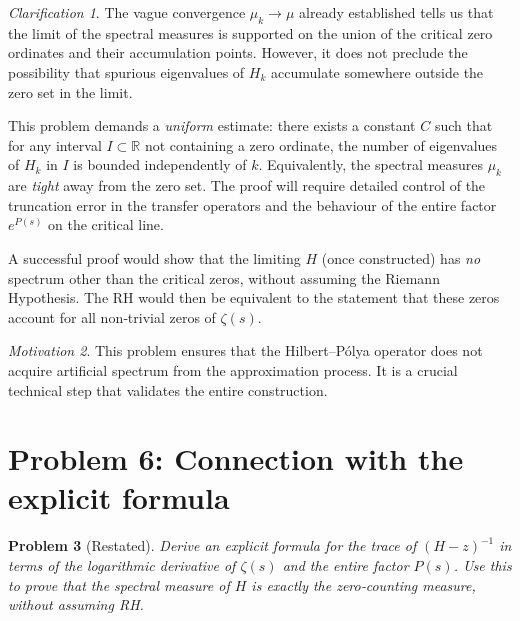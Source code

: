 \documentclass[11pt,a4paper]{article}
\newtheorem{problem}{Problem}[section]
\theoremstyle{remark}
\newtheorem{clarification}[problem]{Clarification}
\newtheorem{motivation}[problem]{Motivation}
\newcommand{\bbR}{\mathbb{R}}
\begin{document}
\begin{clarification}
The vague convergence $\mu_k\to\mu$ already established tells us that the limit of the spectral measures is supported on the union of the critical zero ordinates and their accumulation points. However, it does not preclude the possibility that spurious eigenvalues of $H_k$ accumulate somewhere outside the zero set in the limit. 

This problem demands a \emph{uniform} estimate: there exists a constant $C$ such that for any interval $I\subset\bbR$ not containing a zero ordinate, the number of eigenvalues of $H_k$ in $I$ is bounded independently of $k$. Equivalently, the spectral measures $\mu_k$ are \emph{tight} away from the zero set. The proof will require detailed control of the truncation error in the transfer operators and the behaviour of the entire factor $e^{P(s)}$ on the critical line.

A successful proof would show that the limiting $H$ (once constructed) has \emph{no} spectrum other than the critical zeros, without assuming the Riemann Hypothesis. The RH would then be equivalent to the statement that these zeros account for all non‑trivial zeros of $\zeta(s)$.
\end{clarification}

\begin{motivation}
This problem ensures that the Hilbert--Pólya operator does not acquire artificial spectrum from the approximation process. It is a crucial technical step that validates the entire construction.
\end{motivation}

\section{Problem 6: Connection with the explicit formula}

\begin{problem}[Restated]
Derive an explicit formula for the trace of $(H-z)^{-1}$ in terms of the logarithmic derivative of $\zeta(s)$ and the entire factor $P(s)$. Use this to prove that the spectral measure of $H$ is exactly the zero‑counting measure, without assuming RH.
\end{problem}
\end{document}
